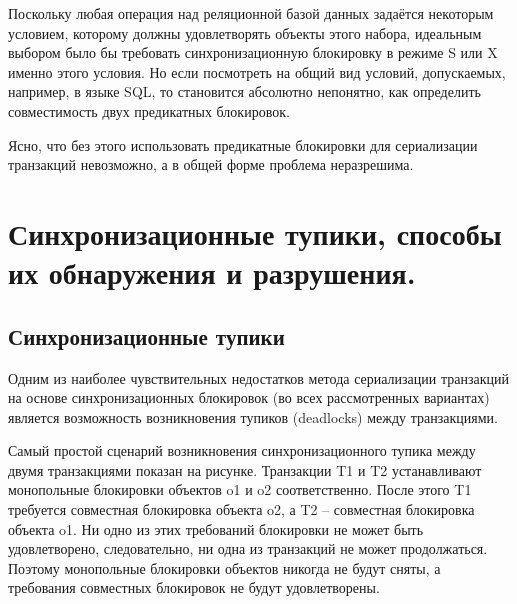 \documentclass[a4paper,12pt]{article}
\begin{document}
Поскольку любая операция над реляционной базой данных задаётся некоторым условием, которому должны удовлетворять объекты этого набора, идеальным выбором было бы требовать синхронизационную блокировку в режиме S или X именно этого условия. Но если посмотреть на общий вид условий, допускаемых, например, в языке SQL, то становится абсолютно непонятно, как определить совместимость двух предикатных блокировок.

Ясно, что без этого использовать предикатные блокировки для сериализации транзакций невозможно, а в общей форме проблема неразрешима.



\section{Синхронизационные тупики, способы их обнаружения и разрушения.}

\subsection{Синхронизационные тупики}

Одним из наиболее чувствительных недостатков метода сериализации транзакций на основе синхронизационных блокировок (во всех рассмотренных вариантах) является возможность возникновения тупиков (deadlocks) между транзакциями.

Самый простой сценарий возникновения синхронизационного тупика между двумя транзакциями показан на рисунке. Транзакции T1 и T2 устанавливают монопольные блокировки объектов o1 и o2 соответственно. После этого T1 требуется совместная блокировка объекта o2, а T2 – совместная блокировка объекта o1. Ни одно из этих требований блокировки не может быть удовлетворено, следовательно, ни одна из транзакций не может продолжаться. Поэтому монопольные блокировки объектов никогда не будут сняты, а требования совместных блокировок не будут удовлетворены.

\begin{center}
\end{center}
\end{document}
